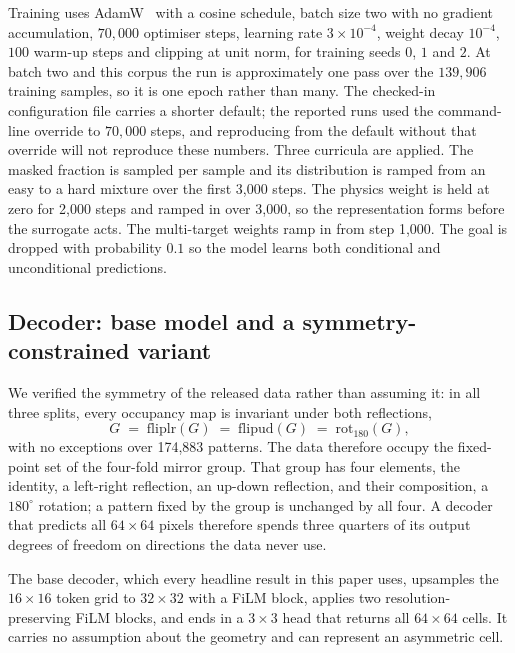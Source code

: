 \documentclass[pdflatex,oneside,sn-mathphys-num]{sn-jnl}
\theoremstyle{thmstyleone}
\theoremstyle{thmstyletwo}
\theoremstyle{thmstylethree}
\begin{document}
Training uses AdamW~\cite{adamw} with a cosine schedule, batch size two with no gradient
accumulation, $70{,}000$ optimiser steps, learning rate $3\times10^{-4}$, weight decay
$10^{-4}$, $100$ warm-up steps and clipping at unit norm, for training seeds $0$, $1$ and
$2$. At batch two and this corpus the run is approximately one pass over the $139{,}906$
training samples, so it is one epoch rather than many. The checked-in configuration file
carries a shorter default; the reported runs used the command-line override to $70{,}000$
steps, and reproducing from the default without that override will not reproduce these
numbers. Three curricula are applied. The masked
fraction is sampled per sample and its distribution is ramped from an easy to a hard
mixture over the first 3{,}000 steps. The physics weight is held at zero for 2{,}000
steps and ramped in over 3{,}000, so the representation forms before the surrogate
acts. The multi-target weights ramp in from step 1{,}000. The goal is dropped with
probability $0.1$ so the model learns both conditional and unconditional predictions.

\subsection{Decoder: base model and a symmetry-constrained variant}

We verified the symmetry of the released data rather than assuming it: in all three
splits, every occupancy map is invariant under both reflections,
\begin{equation}
G \;=\; \mathrm{fliplr}(G) \;=\; \mathrm{flipud}(G)
\;=\; \mathrm{rot}_{180}(G),
\label{eq:sym}
\end{equation}
with no exceptions over 174{,}883 patterns. The data therefore occupy the fixed-point set of the four-fold mirror group. That group has
four elements, the identity, a left-right reflection, an up-down reflection, and their
composition, a $180^{\circ}$ rotation; a pattern fixed by the group is unchanged by all four.
A decoder that predicts all $64\times64$ pixels therefore spends three quarters of its output
degrees of freedom on directions the data never use.

The base decoder, which every headline result in this paper uses, upsamples the
$16\times16$ token grid to $32\times32$ with a FiLM block, applies two resolution-preserving
FiLM blocks, and ends in a $3\times3$ head that returns all $64\times64$ cells. It carries no
assumption about the geometry and can represent an asymmetric cell.
\end{document}
